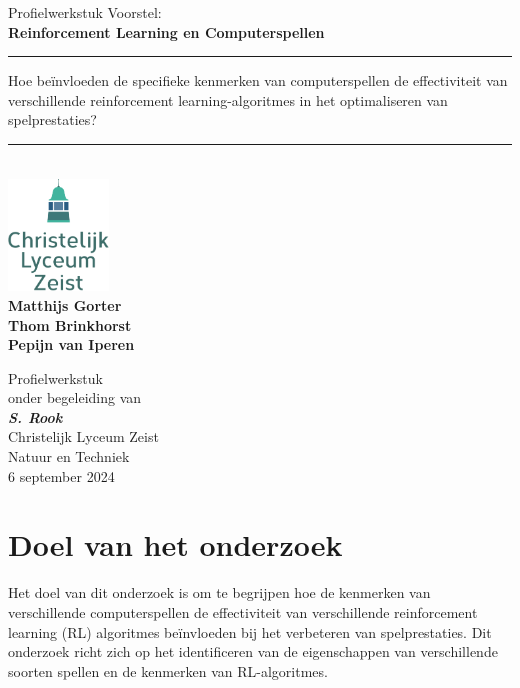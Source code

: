 \documentclass[a4paper,12pt]{article}
\title{}
\author{}
\date{}
\begin{document}
\begin{titlepage}
    \centering
    \vspace*{0cm}
    \LARGE{Profielwerkstuk Voorstel:} \\
    \Huge\textbf{Reinforcement Learning en Computerspellen} \\
    \vspace{1.5cm}
    \rule{\linewidth}{0.4mm}
    \Large
    Hoe beïnvloeden de specifieke kenmerken van computerspellen de effectiviteit van verschillende reinforcement learning-algoritmes in het optimaliseren van spelprestaties? \\
    \rule{\linewidth}{0.4mm} \\
    \vspace{1.5cm}
    \includegraphics[width=0.2\textwidth]{logo-clz.png} \\
    \vspace{\fill}
    \large
    \textbf{Matthijs Gorter} \\
    \textbf{Thom Brinkhorst} \\
    \textbf{Pepijn van Iperen} \\
    \vspace{\fill}
    \normalsize

    Profielwerkstuk \\ onder begeleiding van \\ \textit{\textbf{S. Rook}} \\
    Christelijk Lyceum Zeist \\ Natuur en Techniek \\ 6 september 2024 \\ \newpage
\end{titlepage}
\section{Doel van het onderzoek}
Het doel van dit onderzoek is om te begrijpen hoe de kenmerken van
verschillende computerspellen de effectiviteit van verschillende reinforcement
learning (RL) algoritmes beïnvloeden bij het verbeteren van spelprestaties. Dit
onderzoek richt zich op het identificeren van de eigenschappen van
verschillende soorten spellen en de kenmerken van RL-algoritmes.
\end{document}
